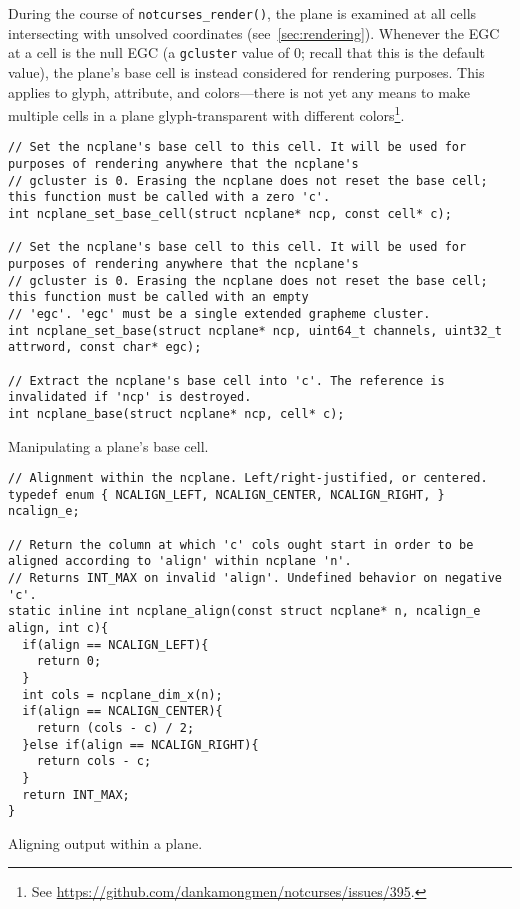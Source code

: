 During the course of \texttt{notcurses\_render()}, the plane is examined at
all cells intersecting with unsolved coordinates (see~\ref{sec:rendering}).
Whenever the EGC at a cell is the null EGC (a \texttt{gcluster} value of 0;
recall that this is the default value), the plane's base cell is instead
considered for rendering purposes. This applies to glyph, attribute, and
colors---there is not yet any means to make multiple cells in a plane glyph-transparent
with different colors\footnote{See \url{https://github.com/dankamongmen/notcurses/issues/395}.}.

\begin{listing}[!htb]
\begin{verbatim}
// Set the ncplane's base cell to this cell. It will be used for purposes of rendering anywhere that the ncplane's
// gcluster is 0. Erasing the ncplane does not reset the base cell; this function must be called with a zero 'c'.
int ncplane_set_base_cell(struct ncplane* ncp, const cell* c);

// Set the ncplane's base cell to this cell. It will be used for purposes of rendering anywhere that the ncplane's
// gcluster is 0. Erasing the ncplane does not reset the base cell; this function must be called with an empty
// 'egc'. 'egc' must be a single extended grapheme cluster.
int ncplane_set_base(struct ncplane* ncp, uint64_t channels, uint32_t attrword, const char* egc);

// Extract the ncplane's base cell into 'c'. The reference is invalidated if 'ncp' is destroyed.
int ncplane_base(struct ncplane* ncp, cell* c);
\end{verbatim}
\caption{Manipulating a plane's base cell.}
\end{listing}

\begin{listing}[!htb]
\begin{verbatim}
// Alignment within the ncplane. Left/right-justified, or centered.
typedef enum { NCALIGN_LEFT, NCALIGN_CENTER, NCALIGN_RIGHT, } ncalign_e;

// Return the column at which 'c' cols ought start in order to be aligned according to 'align' within ncplane 'n'.
// Returns INT_MAX on invalid 'align'. Undefined behavior on negative 'c'.
static inline int ncplane_align(const struct ncplane* n, ncalign_e align, int c){
  if(align == NCALIGN_LEFT){
    return 0;
  }
  int cols = ncplane_dim_x(n);
  if(align == NCALIGN_CENTER){
    return (cols - c) / 2;
  }else if(align == NCALIGN_RIGHT){
    return cols - c;
  }
  return INT_MAX;
}
\end{verbatim}
\caption{Aligning output within a plane.}
\end{listing}

